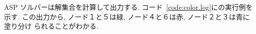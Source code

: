 ASP ソルバーは解集合を計算して出力する. 
コード~\ref{code:color.log}に{\clingo}の実行例を示す. 
この出力から, ノード１と５は緑, ノード４と６は赤, ノード２と３は青に塗り分け
られることがわかる. 












